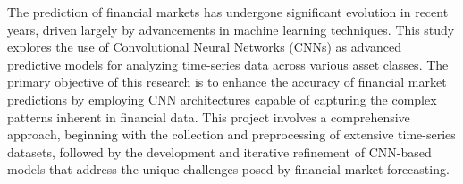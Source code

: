 \thesisspacing %

The prediction of financial markets has undergone significant evolution in recent years, driven largely by advancements in machine learning techniques. This study explores the use of Convolutional Neural Networks (CNNs) as advanced predictive models for analyzing time-series data across various asset classes. The primary objective of this research is to enhance the accuracy of financial market predictions by employing CNN architectures capable of capturing the complex patterns inherent in financial data. This project involves a comprehensive approach, beginning with the collection and preprocessing of extensive time-series datasets, followed by the development and iterative refinement of CNN-based models that address the unique challenges posed by financial market forecasting.